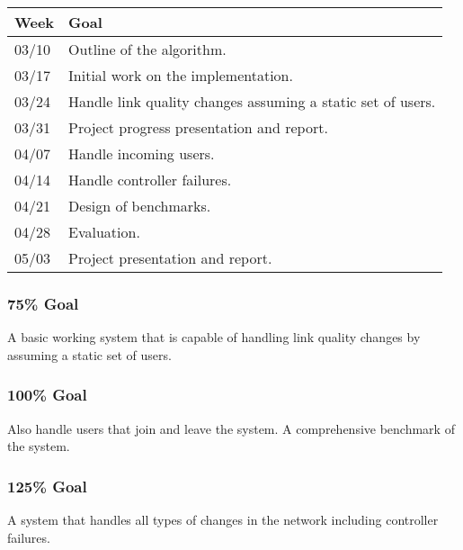 \begin{center}
\begin{tabular}{| l || l | }
\hline
\textbf{Week} & \textbf{Goal} \\ \hline
03/10 & Outline of the algorithm. \\ \hline
03/17 & Initial work on the implementation. \\ \hline
03/24 & Handle link quality changes assuming a static set of users. \\ \hline
03/31 & Project progress presentation and report. \\ \hline
04/07 & Handle incoming users. \\ \hline
04/14 & Handle controller failures. \\ \hline
04/21 & Design of benchmarks. \\ \hline
04/28 & Evaluation. \\ \hline
05/03 & Project presentation and report. \\ \hline
\end{tabular}
\end{center}

\subsubsection{75\% Goal}

A basic working system that is capable of handling link quality changes by assuming a static set of users.

\subsubsection{100\% Goal}

Also handle users that join and leave the system. A comprehensive benchmark of the system.

\subsubsection{125\% Goal}

A system that handles all types of changes in the network including controller failures.
